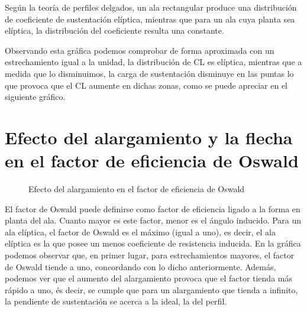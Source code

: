 \documentclass[9pt, a4paper]{article}
\begin{document}
Según la teoría de perfiles delgados, un ala rectangular produce una distribución de coeficiente de sustentación elíptica, mientras que para un ala cuya planta sea elíptica, la distribución del coeficiente resulta una constante.

Observando esta gráfica podemos comprobar de forma aproximada con un estrechamiento igual a la unidad, la distribución de CL es elíptica, mientras que a medida que lo disminuimos, la carga de sustentación disminuye en las puntas lo que provoca que el CL aumente en dichas zonas, como se puede apreciar en el siguiente gráfico.

\section{Efecto del alargamiento y la flecha en el factor de eficiencia de Oswald}

\begin{figure}[H]
  \begin{center}
    \caption{Efecto del alargamiento en el factor de eficiencia de Oswald}
    \label{fig:hw2_4_aspect}
  \end{center}
\end{figure}

El factor de Oswald puede definirse como factor de eficiencia ligado a la forma en planta del ala. Cuanto mayor es este factor, menor es el ángulo inducido. Para un ala elíptica, el factor de Oswald es el máximo (igual a uno), es decir, el ala elíptica es la que posee un menos coeficiente de resistencia inducida.
En la gráfica podemos observar que, en primer lugar, para estrechamientos mayores, el factor de Oswald tiende a uno, concordando con lo dicho anteriormente. Además, podemos ver que el aumento del alargamiento provoca que el factor tienda más rápido a uno, és decir, se cumple que para un alargamiento que tienda a infinito, la pendiente de sustentación se acerca a la ideal, la del perfil.
\end{document}
